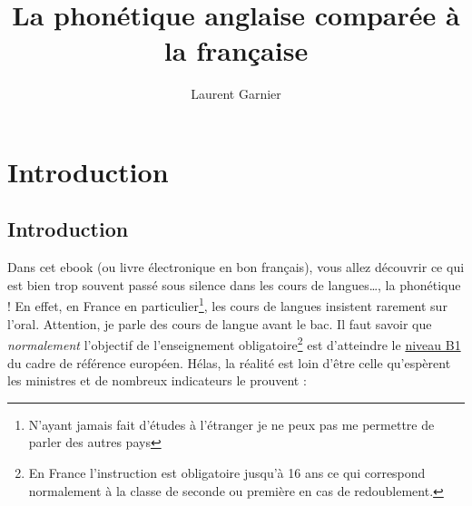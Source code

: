 \documentclass[12pt,a4paper]{book}
\begin{document}
\title{La phonétique anglaise comparée à la française}
\author{Laurent Garnier}

\maketitle
\tableofcontents

\part{Introduction}

\chapter{Introduction}
\label{sec:org9288afb}
Dans cet ebook (ou livre électronique en bon français), vous allez
découvrir ce qui est bien trop souvent passé sous silence dans les
cours de langues\ldots{}, la phonétique ! En effet, en France en
particulier\footnote{N'ayant jamais fait d'études à l'étranger je ne
  peux pas me permettre de parler des autres pays}, les cours de
langues insistent rarement sur l'oral. Attention, je parle des cours
de langue avant le bac. Il faut savoir que \emph{normalement}
l'objectif de l'enseignement obligatoire\footnote{En France
  l'instruction est obligatoire jusqu'à 16 ans ce qui correspond
  normalement à la classe de seconde ou première en cas de
  redoublement.} est d'atteindre le
\href{http://www.cambridgeenglish.org/fr/exams-and-tests/cambridge-english-certificate-cec/}{niveau
  B1} du cadre de référence européen. Hélas, la réalité est
loin d'être celle qu'espèrent les ministres et de nombreux indicateurs le prouvent :
\end{document}
